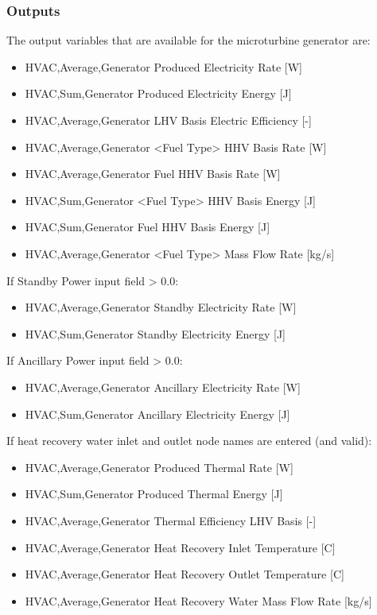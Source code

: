 \subsubsection{Outputs}\label{outputs-7-002}

The output variables that are available for the microturbine generator are:

\begin{itemize}
\item
  HVAC,Average,Generator Produced Electricity Rate {[}W{]}
\item
  HVAC,Sum,Generator Produced Electricity Energy {[}J{]}
\item
  HVAC,Average,Generator LHV Basis Electric Efficiency {[}-{]}
\item
  HVAC,Average,Generator \textless{}Fuel Type\textgreater{} HHV Basis Rate {[}W{]}
\item
  HVAC,Average,Generator Fuel HHV Basis Rate {[}W{]}
\item
  HVAC,Sum,Generator \textless{}Fuel Type\textgreater{} HHV Basis Energy {[}J{]}
\item
  HVAC,Sum,Generator Fuel HHV Basis Energy {[}J{]}
\item
  HVAC,Average,Generator \textless{}Fuel Type\textgreater{} Mass Flow Rate {[}kg/s{]}
\end{itemize}

If Standby Power input field \textgreater{} 0.0:

\begin{itemize}
\item
  HVAC,Average,Generator Standby Electricity Rate {[}W{]}
\item
  HVAC,Sum,Generator Standby Electricity Energy {[}J{]}
\end{itemize}

If Ancillary Power input field \textgreater{} 0.0:

\begin{itemize}
\item
  HVAC,Average,Generator Ancillary Electricity Rate {[}W{]}
\item
  HVAC,Sum,Generator Ancillary Electricity Energy {[}J{]}
\end{itemize}

If heat recovery water inlet and outlet node names are entered (and valid):

\begin{itemize}
\item
  HVAC,Average,Generator Produced Thermal Rate {[}W{]}
\item
  HVAC,Sum,Generator Produced Thermal Energy {[}J{]}
\item
  HVAC,Average,Generator Thermal Efficiency LHV Basis {[}-{]}
\item
  HVAC,Average,Generator Heat Recovery Inlet Temperature {[}C{]}
\item
  HVAC,Average,Generator Heat Recovery Outlet Temperature {[}C{]}
\item
  HVAC,Average,Generator Heat Recovery Water Mass Flow Rate {[}kg/s{]}
\end{itemize}

